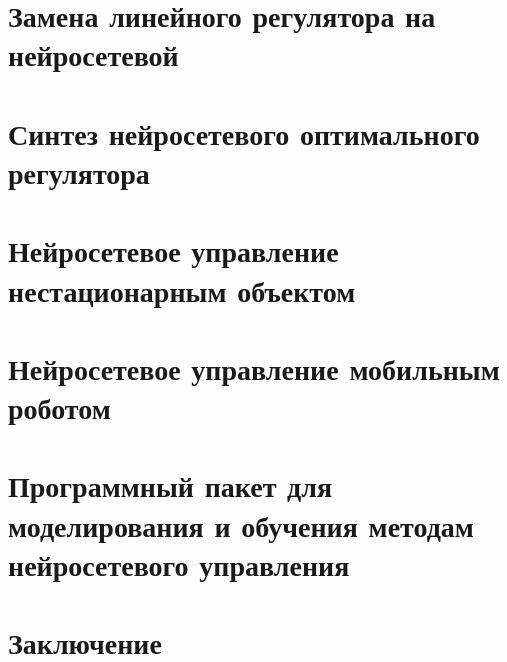 \documentclass[12pt]{rusthesis}
\begin{document}
\chapter{Замена линейного регулятора на нейросетевой}%
\label{linear_to_neural}


\chapter{Синтез нейросетевого оптимального регулятора}%
\label{neural_optimal_control}


\chapter{Нейросетевое управление нестационарным объектом}%
\label{nonst_neural_control}


\chapter{Нейросетевое управление мобильным роботом}%
\label{mobile_robot}


\chapter{Программный пакет для моделирования и обучения методам нейросетевого управления}%
\label{lab_works}


\chapter*{Заключение}




%

%
\end{document}

